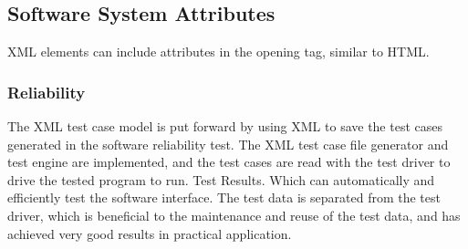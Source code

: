 
\subsection{Software System Attributes}
XML elements can include attributes in the opening tag, similar to HTML.

\subsubsection{Reliability}

The XML test case model is put forward by using XML to save the test cases generated in the software reliability test. 
The XML test case file generator and test engine are implemented, and the test cases are read with the test driver to drive the tested program to run. 
Test Results. Which can automatically and efficiently test the software interface. The test data is separated from the test driver, 
which is beneficial to the maintenance and reuse of the test data, and has achieved very good results in practical application.


